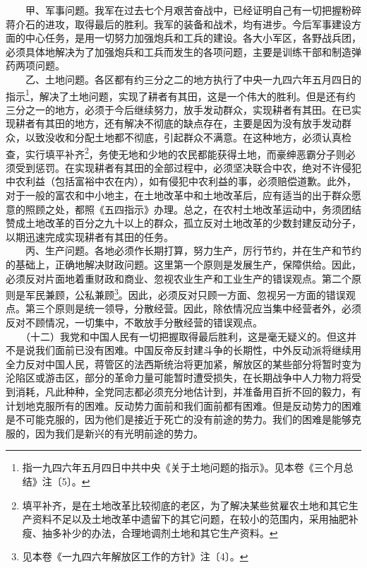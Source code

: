 \documentclass[cn,11pt,chinese]{elegantbook}
\begin{document}
　　甲、军事问题。我军在过去七个月艰苦奋战中，已经证明自己有一切把握粉碎蒋介石的进攻，取得最后的胜利。我军的装备和战术，均有进步。今后军事建设方面的中心任务，是用一切努力加强炮兵和工兵的建设。各大小军区，各野战兵团，必须具体地解决为了加强炮兵和工兵而发生的各项问题，主要是训练干部和制造弹药两项问题。\\
　　乙、土地问题。各区都有约三分之二的地方执行了中央一九四六年五月四日的指示\footnote[9]{ 指一九四六年五月四日中共中央《关于土地问题的指示》。见本卷《三个月总结》注〔5〕。}，解决了土地问题，实现了耕者有其田，这是一个伟大的胜利。但是还有约三分之一的地方，必须于今后继续努力，放手发动群众，实现耕者有其田。在已实现耕者有其田的地方，还有解决不彻底的缺点存在，主要是因为没有放手发动群众，以致没收和分配土地都不彻底，引起群众不满意。在这种地方，必须认真检查，实行填平补齐\footnote[10]{ 填平补齐，是在土地改革比较彻底的老区，为了解决某些贫雇农土地和其它生产资料不足以及土地改革中遗留下的其它问题，在较小的范围内，采用抽肥补瘦、抽多补少的办法，合理地调剂土地和其它生产资料。}，务使无地和少地的农民都能获得土地，而豪绅恶霸分子则必须受到惩罚。在实现耕者有其田的全部过程中，必须坚决联合中农，绝对不许侵犯中农利益（包括富裕中农在内），如有侵犯中农利益的事，必须赔偿道歉。此外，对于一般的富农和中小地主，在土地改革中和土地改革后，应有适当的出于群众愿意的照顾之处，都照《五四指示》办理。总之，在农村土地改革运动中，务须团结赞成土地改革的百分之九十以上的群众，孤立反对土地改革的少数封建反动分子，以期迅速完成实现耕者有其田的任务。\\
　　丙、生产问题。各地必须作长期打算，努力生产，厉行节约，并在生产和节约的基础上，正确地解决财政问题。这里第一个原则是发展生产，保障供给。因此，必须反对片面地着重财政和商业、忽视农业生产和工业生产的错误观点。第二个原则是军民兼顾，公私兼顾\footnote[11]{ 见本卷《一九四六年解放区工作的方针》注〔4〕。}。因此，必须反对只顾一方面、忽视另一方面的错误观点。第三个原则是统一领导，分散经营。因此，除依情况应当集中经营者外，必须反对不顾情况，一切集中，不敢放手分散经营的错误观点。\\
　　（十二）我党和中国人民有一切把握取得最后胜利，这是毫无疑义的。但这并不是说我们面前已没有困难。中国反帝反封建斗争的长期性，中外反动派将继续用全力反对中国人民，蒋管区的法西斯统治将更加紧，解放区的某些部分将暂时变为沦陷区或游击区，部分的革命力量可能暂时遭受损失，在长期战争中人力物力将受到消耗，凡此种种，全党同志都必须充分地估计到，并准备用百折不回的毅力，有计划地克服所有的困难。反动势力面前和我们面前都有困难。但是反动势力的困难是不可能克服的，因为他们是接近于死亡的没有前途的势力。我们的困难是能够克服的，因为我们是新兴的有光明前途的势力。\\
\end{document}
